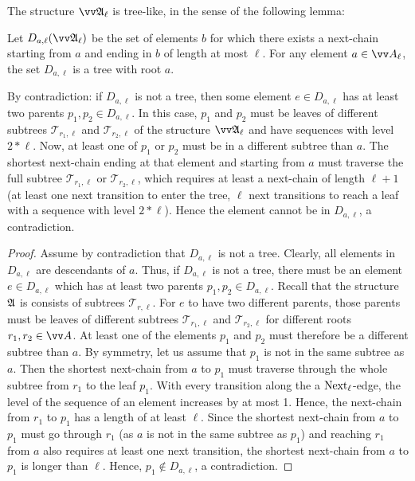 \noindent
The structure $\unravel{A}_{\ell}$ is tree-like, in the sense of the following lemma:
\begin{lemma}\label{lem:companion-tree-like}
  Let $D_{a, \ell}(\unravel{A}_{\ell})$ be the set of elements $b$ for which there exists a next-chain starting from $a$ and ending in $b$ of length at most $\ell$.
  For any element $a \in \unraveldom{A}_{\ell}$, the set $D_{a, \ell}$ is a tree with root $a$.
\end{lemma}
\begin{proofsketch}
  By contradiction: if $D_{a,\ell}$ is not a tree, then some element $e \in D_{a,\ell}$ has at least two parents $p_{1}, p_{2} \in D_{a,\ell}$.
  In this case, $p_{1}$ and $p_{2}$ must be leaves of different subtrees $\mathcal{T}_{r_{1},\ell}$ and $\mathcal{T}_{r_{2},\ell}$ of the structure $\unravel{A}_{\ell}$ and have sequences with level $2 * \ell$.
  Now, at least one of $p_{1}$ or $p_{2}$ must be in a different subtree than $a$.
  The shortest next-chain ending at that element and starting from $a$ must traverse the full subtree $\mathcal{T}_{r_{1},\ell}$ or $\mathcal{T}_{r_{2},\ell}$, which requires at least a next-chain of length $\ell + 1$ (at least one next transition to enter the tree, $\ell$ next transitions to reach a leaf with a sequence with level $2 * \ell$).
  Hence the element cannot be in $D_{a,\ell}$, a contradiction.
\end{proofsketch}
\begin{proof}
  Assume by contradiction that $D_{a,\ell}$ is not a tree.
  Clearly, all elements in $D_{a,\ell}$ are descendants of $a$.
  Thus, if $D_{a,\ell}$ is not a tree, there must be an element $e \in D_{a,\ell}$ which has at least two parents $p_{1}, p_{2} \in D_{a,\ell}$.
  Recall that the structure ${\mathfrak{A}}$ is consists of subtrees $\mathcal{T}_{r,\ell}$.
  For $e$ to have two different parents, those parents must be leaves of different subtrees $\mathcal{T}_{r_{1},\ell}$ and $\mathcal{T}_{r_{2}, \ell}$ for different roots $r_{1}, r_{2} \in \unraveldom{A}$.
  At least one of the elements $p_{1}$ and $p_{2}$ must therefore be a different subtree than $a$.
  By symmetry, let us assume that $p_{1}$ is not in the same subtree as $a$.
  Then the shortest next-chain from $a$ to $p_{1}$ must traverse through the whole subtree from $r_{1}$ to the leaf $p_{1}$.
  With every transition along the a $\mathrm{Next}_{\ell}$-edge, the level of the sequence of an element increases by at most 1.
  Hence, the next-chain from $r_{1}$ to $p_{1}$ has a length of at least $\ell$.
  Since the shortest next-chain from $a$ to $p_{1}$ must go through $r_{1}$ (as $a$ is not in the same subtree as $p_{1}$) and reaching $r_{1}$ from $a$ also requires at least one next transition, the shortest next-chain from $a$ to $p_{1}$ is longer than $\ell$.
  Hence, $p_{1} \notin D_{a,\ell}$, a contradiction.
\end{proof}

